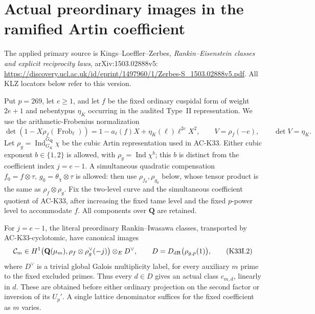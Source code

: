 \section{Actual preordinary images in the ramified Artin coefficient}
\label{sec:preordinary-artin-image}

The applied primary source is Kings--Loeffler--Zerbes,
\emph{Rankin--Eisenstein classes and explicit reciprocity laws},
arXiv:1503.02888v5:
\url{https://discovery.ucl.ac.uk/id/eprint/1497960/1/Zerbes-S_1503.02888v5.pdf}.
All KLZ locators below refer to this version.

\begin{proposition}
\label{AC-K33-image}
Put \(p=269\), let \(e\geq1\), and let \(f\) be the fixed ordinary cuspidal
form of weight \(2e+1\) and nebentypus \(\eta_K\) occurring in the audited
Type~II representation.  We use the arithmetic-Frobenius normalization
\[
 \det(1-X\rho_f(\operatorname{Frob}_\ell))
  =1-a_\ell(f)X+\eta_K(\ell)\ell^{2e}X^2,\qquad
 V=\rho_f(-e),\qquad \det V=\eta_K.                 \tag{K33I.1}
\]
Let \(\rho_g=\operatorname{Ind}_{G_K}^{G_{\mathbf Q}}\chi\) be the cubic
Artin representation used in AC-K33.  Either cubic exponent
\(b\in\{1,2\}\) is allowed, with \(\rho_g=\operatorname{Ind}\chi^b\);
this \(b\) is distinct from the coefficient index \(j=e-1\).
A simultaneous quadratic
compensation \(f_0=f\otimes\tau,\ g_0=\theta_\chi\otimes\tau\) is allowed:
then use \(\rho_{f_0},\rho_{g_0}\) below, whose tensor product is the same
as \(\rho_f\otimes\rho_g\).  Fix the two-level curve and the simultaneous
coefficient quotient of AC-K33, after increasing the fixed tame level
and the fixed \(p\)-power level to accommodate \(f\).  All components
over \(\mathbf Q\) are retained.

For \(j=e-1\), the literal preordinary Rankin--Iwasawa classes, transported
by AC-K33-cyclotomic, have canonical images
\[
 {\cal C}_m\in
 H^1\bigl(\mathbf Q(\mu_m),
       \rho_f\otimes\rho_g^\vee(-j)\bigr)
       \otimes_E D^\vee,\qquad
 D=D_{\rm dR}\bigl(\rho_{g,p}(1)\bigr),             \tag{K33I.2}
\]
where \(D^\vee\) is a trivial global Galois multiplicity label,
for every auxiliary \(m\) prime to the fixed excluded primes.  Thus every
\(d\in D\) gives an actual class \(c_{m,d}\), linearly in \(d\).
These are obtained before either ordinary projection on the second
factor or inversion of its \(U_p'\).  A single lattice denominator
suffices for the fixed coefficient as \(m\) varies.


\end{proposition}
